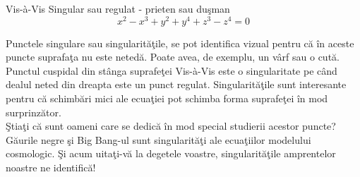 \begin{surferPage}{Vis-\`a-Vis}
Singular sau regulat - prieten sau du\c sman\\
\smallskip
\[x^2	- x^3+ y^2+ y^4+ z^3- z^4	=  0\]

\vspace{0.3cm}
Punctele singulare sau singularit\u a\c tile, se pot identifica vizual pentru c\u a \^in aceste puncte suprafa\c ta nu este neted\u a. Poate avea, de exemplu, 
un v\^arf sau
o cut\u a.
\\
\vspace{0.3cm}
Punctul cuspidal din st\^anga suprafe\c tei Vis-\`a-Vis este o singularitate pe c\^and dealul neted din dreapta este un punct regulat. 
Singularit\u a\c tile sunt interesante pentru c\u a schimb\u ari mici ale ecua\c tiei pot schimba forma suprafe\c tei \^in mod surprinz\u ator.
\\

\vspace{0.3cm}
\c Stia\c ti c\u a sunt oameni care se dedic\u a \^in mod special studierii acestor puncte? G\u aurile negre \c si Big Bang-ul sunt singularit\u a\c ti 
ale ecua\c tiilor modelului cosmologic. \c Si acum uita\c ti-v\u a la degetele voastre, singularit\u a\c tile amprentelor noastre ne identific\u a!
\end{surferPage}

